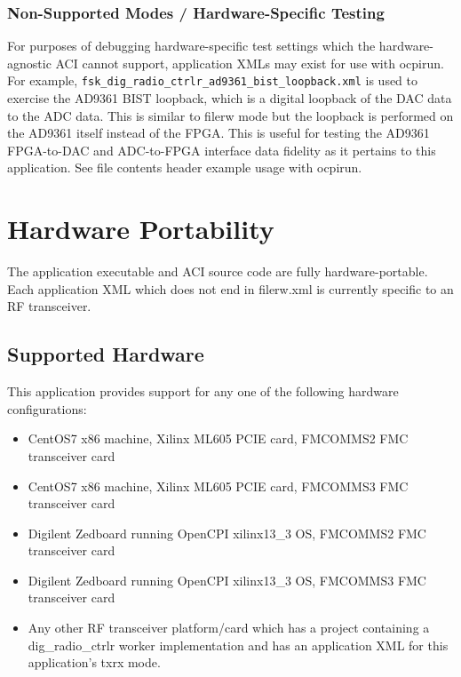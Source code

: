 \begin{landscape}
      \subsubsection{Non-Supported Modes / Hardware-Specific Testing}

        For purposes of debugging hardware-specific test settings which the
        hardware-agnostic ACI cannot support, application XMLs may exist for use
        with ocpirun. For example,
        \texttt{fsk\_dig\_radio\_ctrlr\_ad9361\_bist\_loopback.xml} is used
        to exercise the AD9361 BIST loopback, which is a digital loopback of
        the DAC data to the ADC data. This is similar to filerw mode but the
        loopback is performed on the AD9361 itself instead of the FPGA. This
        is useful for testing the AD9361 FPGA-to-DAC and ADC-to-FPGA interface
        data fidelity as it pertains to this application. See file contents
        header example usage with ocpirun.

\end{landscape}

\section{Hardware Portability}

  The application executable and ACI source code are fully hardware-portable.
  Each application XML which does not end in filerw.xml is
  currently specific
  to an RF transceiver.

  \subsection{Supported Hardware}
    This application provides support for
    any one of the following hardware configurations:
    \begin{itemize}
      \item CentOS7 x86 machine, Xilinx ML605 PCIE card, FMCOMMS2 FMC
        transceiver card
      \item CentOS7 x86 machine, Xilinx ML605 PCIE card, FMCOMMS3 FMC
        transceiver card
      \item Digilent Zedboard running OpenCPI xilinx13\_3 OS, FMCOMMS2 FMC
        transceiver card
      \item Digilent Zedboard running OpenCPI xilinx13\_3 OS, FMCOMMS3 FMC
        transceiver card
      \item Any other RF transceiver platform/card which has a project
        containing a
        dig\_radio\_ctrlr worker implementation and has an application
        XML for this application's txrx mode.
    \end{itemize}

